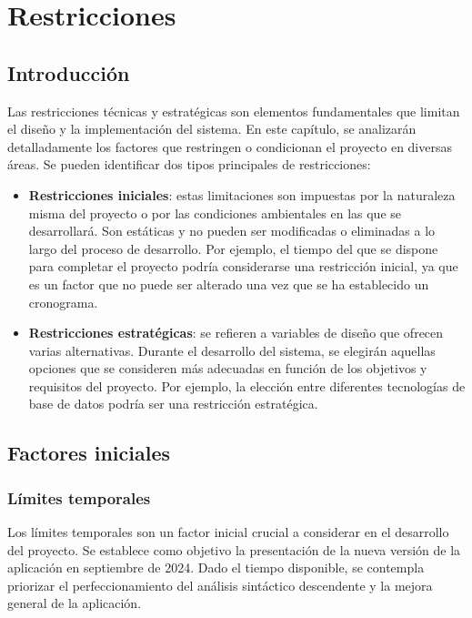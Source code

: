\chapter{Restricciones} \label{cap:restricciones}

\section{Introducción}

Las restricciones técnicas y estratégicas son elementos fundamentales que limitan el diseño y la implementación del sistema. En este capítulo, se analizarán detalladamente los factores que restringen o condicionan el proyecto en diversas áreas. Se pueden identificar dos tipos principales de restricciones:

\begin{itemize}
    \item \textbf{Restricciones iniciales}: estas limitaciones son impuestas por la naturaleza misma del proyecto o por las condiciones ambientales en las que se desarrollará. Son estáticas y no pueden ser modificadas o eliminadas a lo largo del proceso de desarrollo. Por ejemplo, el tiempo del que se dispone para completar el proyecto podría considerarse una restricción inicial, ya que es un factor que no puede ser alterado una vez que se ha establecido un cronograma.
    
    \item \textbf{Restricciones estratégicas}: se refieren a variables de diseño que ofrecen varias alternativas. Durante el desarrollo del sistema, se elegirán aquellas opciones que se consideren más adecuadas en función de los objetivos y requisitos del proyecto. Por ejemplo, la elección entre diferentes tecnologías de base de datos podría ser una restricción estratégica.
\end{itemize}

\section{Factores iniciales} \label{sec:iniciales}

\subsection{Límites temporales}

Los límites temporales son un factor inicial crucial a considerar en el desarrollo del proyecto. Se establece como objetivo la presentación de la nueva versión de la aplicación en septiembre de 2024. Dado el tiempo disponible, se contempla priorizar el perfeccionamiento del análisis sintáctico descendente y la mejora general de la aplicación. 

